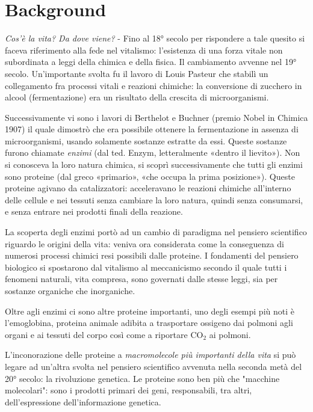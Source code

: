 \chapter{Background}

\textit{Cos'è la vita? Da dove viene?} - Fino al 18° secolo per rispondere a tale quesito si faceva riferimento alla fede nel vitalismo: l'esistenza di una forza vitale non subordinata a leggi della chimica e  della fisica.
Il cambiamento avvenne nel 19° secolo.
Un'importante svolta fu il lavoro di Louis Pasteur che stabilì un collegamento fra processi vitali e reazioni chimiche: la conversione di zucchero in alcool (fermentazione) era un risultato della crescita di microorganismi.
\par Successivamente vi sono i lavori di Berthelot e Buchner (premio Nobel in Chimica 1907) il quale dimostrò che era possibile ottenere la fermentazione in assenza di microorganismi, usando solamente sostanze estratte da essi.
Queste sostanze furono chiamate \textit{enzimi} (dal ted. Enzym, letteralmente «dentro il lievito»\cite{enzimaTreccani}). Non si conosceva la loro natura chimica, si scoprì successivamente che tutti gli enzimi sono proteine (dal greco «primario», «che occupa la prima posizione»).
Queste proteine agivano da catalizzatori: acceleravano le reazioni chimiche all'interno delle cellule e nei tessuti senza cambiare la loro natura, quindi senza consumarsi, e senza entrare nei prodotti finali della reazione.
\par La scoperta degli enzimi portò ad un cambio di paradigma nel pensiero scientifico riguardo le origini della vita: veniva ora considerata come la conseguenza di numerosi processi chimici resi possibili dalle proteine\cite{kessel_ben-tal_2018}.
I fondamenti del pensiero biologico si spostarono dal vitalismo al meccanicismo secondo il quale tutti i fenomeni naturali, vita compresa, sono governati dalle stesse leggi, sia per sostanze organiche che inorganiche.
\par Oltre agli enzimi ci sono altre proteine importanti, uno degli esempi più noti è l'emoglobina, proteina animale adibita a trasportare ossigeno dai polmoni agli organi e ai tessuti del corpo così come a riportare CO$_{2}$ ai polmoni. 
\par L'inconorazione delle proteine a \textit{macromolecole più importanti della vita} si può legare ad un'altra svolta nel pensiero scientifico avvenuta nella seconda metà del 20° secolo: la rivoluzione genetica. 
Le proteine sono ben più che "macchine molecolari": sono i prodotti primari dei geni, responsabili, tra altri, dell'espressione dell'informazione genetica.


